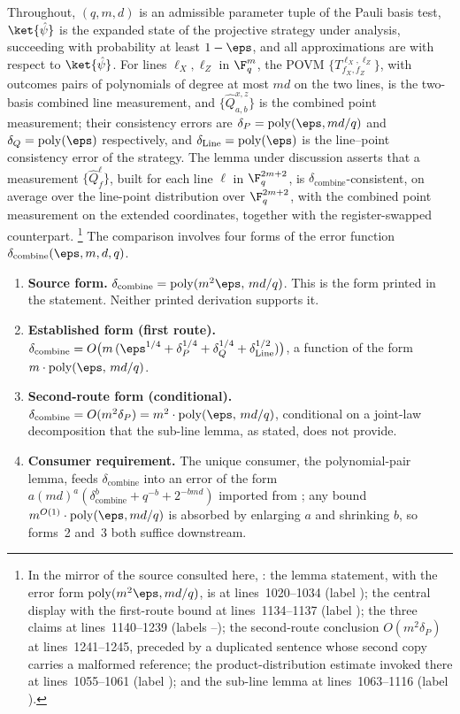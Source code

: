 \documentclass[11pt]{article}
\DeclareMathOperator{\poly}{poly}
\begin{document}
Throughout, $(q,m,d)$ is an admissible parameter tuple of the Pauli basis
test, $\ket{\hat\psi}$ is the expanded state of the projective strategy
under analysis, succeeding with probability at least $1-\eps$, and all
approximations are with respect to $\ket{\hat\psi}$.  For lines
$\ell_X, \ell_Z$ in $\F_q^m$, the POVM $\{T^{\ell_X,\ell_Z}_{f_X,f_Z}\}$,
with outcomes pairs of polynomials of degree at most $md$ on the two
lines, is the two-basis combined line measurement, and
$\{\hat Q^{x,z}_{a,b}\}$ is the combined point measurement; their
consistency errors are $\delta_P = \poly(\eps, md/q)$ and
$\delta_Q = \poly(\eps)$ respectively, and
$\delta_{\mathrm{Line}} = \poly(\eps)$ is the line--point consistency
error of the strategy.  The lemma under discussion asserts that a
measurement $\{\hat Q^{\ell}_f\}$, built for each line $\ell$ in
$\F_q^{2m+2}$, is $\delta_{\mathrm{combine}}$-consistent, on average over
the line-point distribution over $\F_q^{2m+2}$, with the combined point
measurement on the extended coordinates, together with the
register-swapped counterpart.%
\footnote{In the mirror of the source consulted here,
: the
lemma statement, with the error form $\poly(m^2\eps, md/q)$, is at
lines~1020--1034 (label ); the central display with
the first-route bound at lines~1134--1137
(label ); the three claims at
lines~1140--1239 (labels --); the
second-route conclusion $O(m^2\delta_P)$ at lines~1241--1245, preceded by
a duplicated sentence whose second copy carries a malformed reference;
the product-distribution estimate invoked there at lines~1055--1061
(label ); and the sub-line lemma at
lines~1063--1116 (label ).}
The comparison involves four forms of the error function
$\delta_{\mathrm{combine}}(\eps,m,d,q)$.
\begin{enumerate}
  \item \textbf{Source form.}
  $\delta_{\mathrm{combine}} = \poly(m^2\eps,\, md/q)$.  This is the form
  printed in the statement.  Neither printed derivation supports it.
  \item \textbf{Established form (first route).}
  $\delta_{\mathrm{combine}}
  = O\big(m\,(\eps^{1/4} + \delta_P^{1/4} + \delta_Q^{1/4}
  + \delta_{\mathrm{Line}}^{1/2})\big)$, a function of the form
  $m \cdot \poly(\eps,\, md/q)$.
  \item \textbf{Second-route form (conditional).}
  $\delta_{\mathrm{combine}} = O(m^2 \delta_P)
  = m^2 \cdot \poly(\eps,\, md/q)$, conditional on a joint-law
  decomposition that the sub-line lemma, as stated, does not provide.
  \item \textbf{Consumer requirement.}  The unique consumer, the
  polynomial-pair lemma, feeds $\delta_{\mathrm{combine}}$ into an error
  of the form
  $a(md)^a(\delta_{\mathrm{combine}}^b + q^{-b} + 2^{-bmd})$ imported
  from \cite{Ji2020LowIndividualDegree}; any bound
  $m^{O(1)} \cdot \poly(\eps, md/q)$ is absorbed by enlarging $a$ and
  shrinking $b$, so forms~2 and~3 both suffice downstream.
\end{enumerate}
\end{document}
